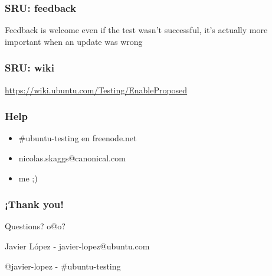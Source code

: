 \documentclass[dvipsnames]{beamer}
\begin{document}
\begin{frame}
  \frametitle{SRU: feedback}
  \begin{center}
  \end{center}
  \begin{center}
      Feedback is welcome even if the test wasn't successful, it's actually more important when an update was wrong
  \end{center}
\end{frame}

\begin{frame}
  \frametitle{SRU: wiki}
  \begin{center}
  \end{center}
  \begin{center}
      \url{https://wiki.ubuntu.com/Testing/EnableProposed}
  \end{center}
\end{frame}

\begin{frame}
  \frametitle {Help}
  \begin{itemize}
  \item \#ubuntu-testing en freenode.net
  \item nicolas.skaggs@canonical.com
  \item me ;)
  \end{itemize}
\end{frame}

\begin{frame}
  \frametitle {¡Thank you!}
  \begin{center}
      {\huge Questions? o@o?}
  \end{center}
  \begin{center}
      {Javier López - javier-lopez@ubuntu.com}
  \end{center}
  \begin{center}
      {@javier-lopez - \#ubuntu-testing}
  \end{center}
\end{frame}
\end{document}
